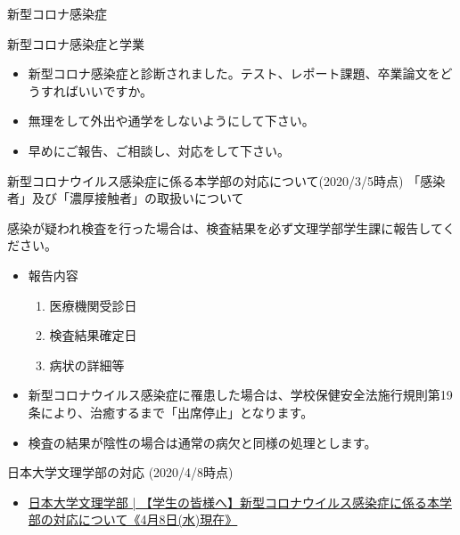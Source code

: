 \documentclass[a4j,10pt]{jsarticle}
\def\lthtmlcheckvsize{\ifdim\ht\sizebox<\vsize 
  \ifdim\wd\sizebox<\hsize\expandafter\hfill\fi \expandafter\vfill
  \else\expandafter\vss\fi}%
\begin{document}
{\newpage\clearpage
{}%
\begin{frame}[label={sec:org810c794},fragile]{新型コロナ感染症}
\begin{block}{新型コロナ感染症と学業}
\begin{itemize}
\item 新型コロナ感染症と診断されました。テスト、レポート課題、卒業論文をどうすればいいですか。
\item 無理をして外出や通学をしないようにして下さい。
\item 早めにご報告、ご相談し、対応をして下さい。
\end{itemize}
\par
\begin{block}{新型コロナウイルス感染症に係る本学部の対応について(2020/3/5時点)}
「感染者」及び「濃厚接触者」の取扱いについて
\par
感染が疑われ検査を行った場合は、検査結果を必ず文理学部学生課に報告してください。
\begin{itemize}
\item 報告内容
\begin{enumerate}
\item 医療機関受診日
\item 検査結果確定日
\item 病状の詳細等
\end{enumerate}
\item 新型コロナウイルス感染症に罹患した場合は、学校保健安全法施行規則第19条により、治癒するまで「出席停止」となります。
\item 検査の結果が陰性の場合は通常の病欠と同様の処理とします。
\end{itemize}
\end{block}
\par
\begin{block}{日本大学文理学部の対応 (2020/4/8時点)}
\begin{itemize}
\item \href{https://www.chs.nihon-u.ac.jp/student/2020-04-08/15016/}{日本大学文理学部 | 【学生の皆様へ】新型コロナウイルス感染症に係る本学部の対応について《4月8日(水)現在》}
\end{itemize}
\end{block}
\end{block}
\end{frame}%
\lthtmlfigureZ
\lthtmlcheckvsize\clearpage}
\end{document}
